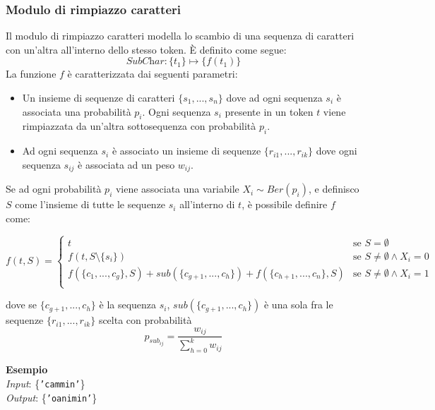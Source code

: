\documentclass[12pt]{article}
\begin{document}
\subsubsection{Modulo di rimpiazzo caratteri}
Il modulo di rimpiazzo caratteri modella lo scambio di una sequenza di caratteri con un'altra all'interno dello stesso token. È definito come segue:
\begin{equation}
\textit{SubChar}: \{ t_1 \} \mapsto \{ f(t_1) \}
\end{equation}
La funzione $f$ è caratterizzata dai seguenti parametri:
\begin{itemize}
\item Un insieme di sequenze di caratteri $\{s_1,...,s_n\}$ dove ad ogni sequenza $s_i$ è associata una probabilità $p_i$. Ogni sequenza $s_i$ presente in un token $t$ viene rimpiazzata da un'altra sottosequenza con probabilità $p_i$.
\item Ad ogni sequenza $s_i$ è associato un insieme di sequenze $\{r_{i1},...,r_{ik}\}$ dove ogni sequenza $s_{ij}$ è associata ad un peso $w_{ij}$.
\end{itemize}
Se ad ogni probabilità $p_i$ viene associata una variabile $X_i \sim Ber(p_i)$, e definisco $S$ come l'insieme di tutte le sequenze $s_i$ all'interno di $t$, è possibile definire $f$ come:

\begin{equation}
f(t,S) = \begin{cases}
t & \text{se $S = \emptyset$} \\
f(t,S \setminus \{s_i\}) & \text{se $S \neq \emptyset \wedge X_i = 0$} \\
f(\{c_1,...,c_g\},S) + sub(\{c_{g+1},...,c_h\}) + f(\{c_{h+1},...,c_n\},S)  
& \text{se $S \neq \emptyset \wedge X_i = 1$} \\
\end{cases}
\end{equation}

dove se $\{c_{g+1},...,c_h\}$ è la sequenza $s_i$, $sub(\{c_{g+1},...,c_h\})$ è una sola fra le sequenze $\{r_{i1},...,r_{ik}\}$  scelta con probabilità
\begin{equation}
p_{sub_{ij}} =
\frac{w_{ij}}
{{\sum_{h=0}^{k}}w_{ij}}
\end{equation}

\noindent
\textbf{Esempio}\\
\textit{Input}: \{\texttt{'cammin'}\}\\
\textit{Output}: \{\texttt{'oanimin'}\}
\end{document}
